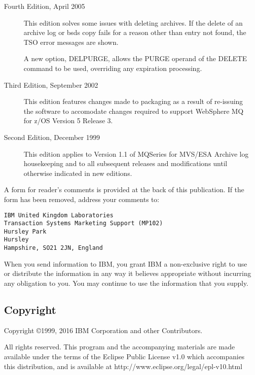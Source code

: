 \documentclass[a4paper,12pt]{report}
\begin{document}
%
%
\begin{description}
\item [Fourth Edition, April 2005]
This edition solves some issues with deleting archives.
If the delete of an archive log or bsds copy fails for a reason other
than entry not found, the TSO error messages are shown.

A new option, DELPURGE, allows the PURGE operand of the DELETE
command to be used, overriding any expiration processing.

\item [Third Edition, September 2002]
This edition features changes made to packaging as a result of
re-issuing the software to accomodate changes required to support
WebSphere MQ for z/OS Version 5 Release 3.

\item [Second Edition, December 1999]
This edition applies to Version 1.1 of MQSeries for MVS/ESA
Archive log housekeeping
and to all subsequent releases and modifications until
otherwise indicated in new editions.
\end{description}
%
A form for reader's comments is provided at the back of this publication.
If the form has been removed, address your comments to:
\begin{verbatim}
IBM United Kingdom Laboratories
Transaction Systems Marketing Support (MP102)
Hursley Park
Hursley
Hampshire, SO21 2JN, England
\end{verbatim}

When you send information to IBM, you grant IBM a non-exclusive right
to use or distribute the information in any way it believes appropriate
without incurring any obligation to you.  You may continue to use the
information that you supply.
%
\subsection{Copyright}
Copyright \copyright 1999, 2016 IBM Corporation and other Contributors.

All rights reserved. This program and the accompanying materials
are made available under the terms of the Eclipse Public License v1.0
which accompanies this distribution, and is available at
http://www.eclipse.org/legal/epl-v10.html
\end{document}
